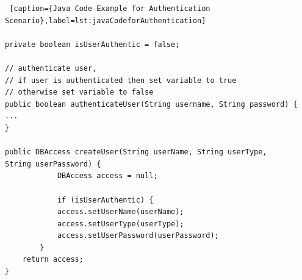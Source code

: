 \begin{lstlisting} [caption={Java Code Example for Authentication Scenario},label=lst:javaCodeforAuthentication]

private boolean isUserAuthentic = false;

// authenticate user,
// if user is authenticated then set variable to true
// otherwise set variable to false
public boolean authenticateUser(String username, String password) {
...
}

public DBAccess createUser(String userName, String userType,
String userPassword) {
			DBAccess access = null;
			
			if (isUserAuthentic) {
			access.setUserName(userName);
			access.setUserType(userType);
			access.setUserPassword(userPassword);
		}
	return access;
}
\end{lstlisting}

